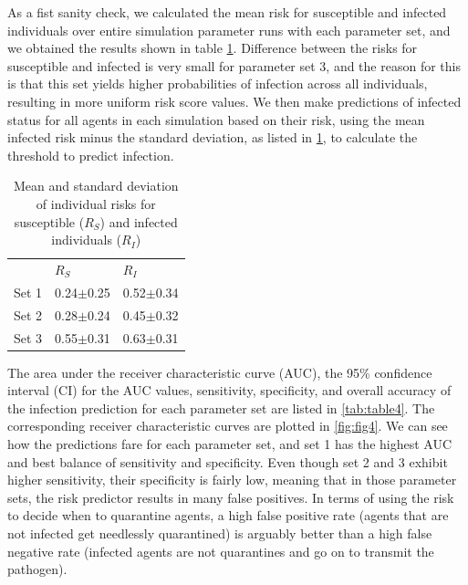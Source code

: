 \documentclass{article}
\begin{document}
As a fist sanity check, we calculated the mean risk for susceptible and infected individuals over entire simulation parameter runs with each parameter set, and we obtained the results shown in table \ref{tab:table3}. Difference between the risks for susceptible and infected is very small for parameter set 3, and the reason for this is that this set yields higher probabilities of infection across all individuals, resulting in more uniform risk score values. We then make predictions of infected status for all agents in each simulation based on their risk, using the mean infected risk minus the standard deviation, as listed in \ref{tab:table3}, to calculate the threshold to predict infection.

\begin{table}
\caption{Mean and standard deviation of individual risks for susceptible ($R_S$) and infected individuals ($R_I$)}
\centering
\begin{tabular}{lll}
\rowcolor[rgb]{0.878,0.878,0.878}         & $R_S$        & $R_I$         \\
{\cellcolor[rgb]{0.878,0.878,0.878}}Set 1 & 0.24$\pm$0.25 & 0.52$\pm$0.34  \\
{\cellcolor[rgb]{0.878,0.878,0.878}}Set 2 & 0.28$\pm$0.24 & 0.45$\pm$0.32  \\
{\cellcolor[rgb]{0.878,0.878,0.878}}Set 3 & 0.55$\pm$0.31 & 0.63$\pm$0.31 
\end{tabular}
\label{tab:table3}
\end{table}

The area under the receiver characteristic curve (AUC), the 95\% confidence interval (CI) for the AUC values, sensitivity, specificity, and overall accuracy of the infection prediction for each parameter set are listed in \ref{tab:table4}. The corresponding receiver characteristic curves are plotted in \ref{fig:fig4}. We can see how the predictions fare for each parameter set, and set 1 has the highest AUC and best balance of sensitivity and specificity. Even though set 2 and 3 exhibit higher sensitivity, their specificity is fairly low, meaning that in those parameter sets, the risk predictor results in many false positives. In terms of using the risk to decide when to quarantine agents, a high false positive rate (agents that are not infected get needlessly quarantined) is arguably better than a high false negative rate (infected agents are not quarantines and go on to transmit the pathogen). 
\end{document}
